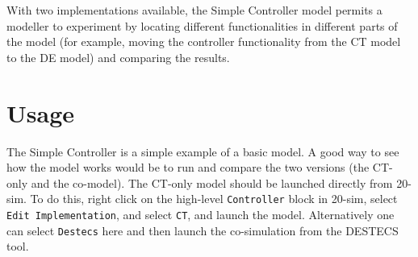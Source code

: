 With two implementations available, the Simple Controller model
permits a modeller to experiment by locating different functionalities
in different parts of the model (for example, moving the controller
functionality from the CT model to the DE model) and comparing the
results. 

\section{Usage} 
The Simple Controller is a simple
example of a basic model. A good way to see how the model works
would be to run and compare the two versions (the CT-only and
the co-model). The CT-only model should be launched directly
from 20-sim. To do this, right click on the high-level \texttt{Controller} block in
20-sim, select \texttt{Edit Implementation}, and select
\texttt{CT}, and launch the model. 
Alternatively one can select \texttt{Destecs} here and
then launch the co-simulation from the DESTECS tool.
